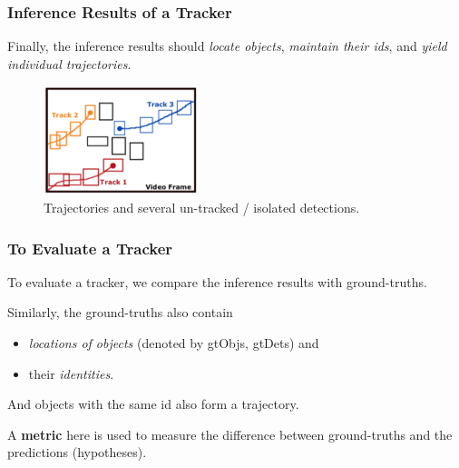 \documentclass[slidetop, mathserif, dvipsnames]{beamer}
\begin{document}
\begin{frame}
	\frametitle{Inference Results of a Tracker}

	Finally, the inference results should \emph{locate objects},
	\emph{maintain their ids},
	and \emph{yield individual trajectories}.

	\begin{figure}
		\includegraphics[height=90pt]{pics/fig1.png}
		\caption{Trajectories and several un-tracked / isolated detections.}
	\end{figure}

\end{frame}

\begin{frame}
	\frametitle{To Evaluate a Tracker}

	To evaluate a tracker, we compare the inference results with ground-truths.

	\quad

	Similarly, the ground-truths also contain
	\begin{itemize}
	\item \emph{locations of objects} (denoted by gtObjs, gtDets) and
	\item their \emph{identities}.
	\end{itemize}
	And objects with the same id also form a trajectory.

	\quad

	A {\bf metric} here is used to measure the difference between
	ground-truths and the predictions (hypotheses).

\end{frame}
\end{document}
